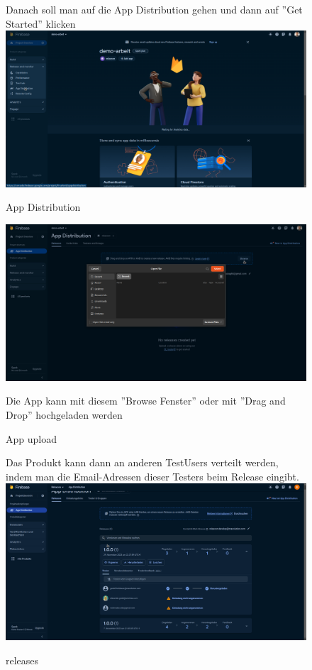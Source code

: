\begin{figure}
  Danach soll man  auf die App Distribution gehen und dann auf ''Get Started'' klicken
  \includegraphics[width=\textwidth]{./pics/firebase3.png}
  \caption{App Distribution}
\end{figure}

\begin{figure}
  \includegraphics[width=\textwidth]{./pics/firebase4.png}
  \caption{App upload}
  Die App kann mit diesem ''Browse Fenster'' oder mit ''Drag and Drop'' hochgeladen werden

\end{figure}



\begin{figure}
  Das Produkt kann dann an anderen TestUsers verteilt werden, indem man die Email-Adressen dieser Testers beim Release eingibt.
  \includegraphics[width=\textwidth]{./pics/firebase5.png}
  \caption{releases}
\end{figure}

